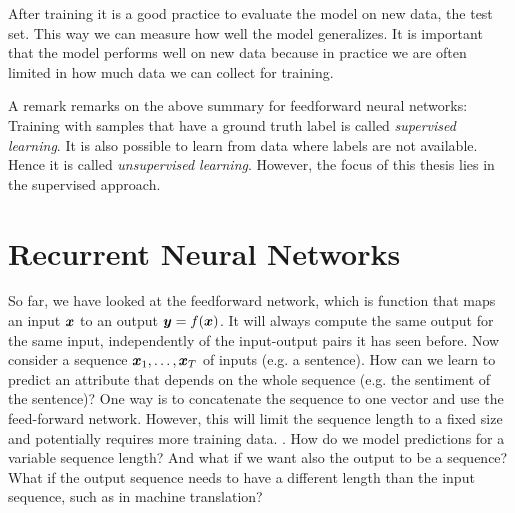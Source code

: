 		After training it is a good practice to evaluate the model on new data, the test set.
		This way we can measure how well the model generalizes.
		It is important that the model performs well on new data because in practice we are often limited in how much data we can collect for training.
		
		A remark remarks on the above summary for feedforward neural networks:
		Training with samples that have a ground truth label is called \emph{supervised learning}.
		It is also possible to learn from data where labels are not available.
		Hence it is called \emph{unsupervised learning}.
		However, the focus of this thesis lies in the supervised approach.
		
	
	\section{Recurrent Neural Networks}\label{sec:recurrent_neural_networks}
		\newcommand{\imagecourtesycolah}{Image courtesy Christopher Olah \mbox{\href{http://colah.github.io/}{(colah.github.io)}}}
		So far, we have looked at the feedforward network, which is function that maps an input $\bm{x}$ to an output $\bm{y} = f(\bm{x})$.
		It will always compute the same output for the same input, independently of the input-output pairs it has seen before.
		Now consider a sequence $\bm{x}_1, \dots, \bm{x}_T$ of inputs (e.g. a sentence).
		How can we learn to predict an attribute that depends on the whole sequence (e.g. the sentiment of the sentence)?
		One way is to concatenate the sequence to one vector and use the feed-forward network.
		However, this will limit the sequence length to a fixed size and potentially requires more training data.
		.
		How do we model predictions for a variable sequence length?
		And what if we want also the output to be a sequence? 
		What if the output sequence needs to have a different length than the input sequence, such as in machine translation? 
		
